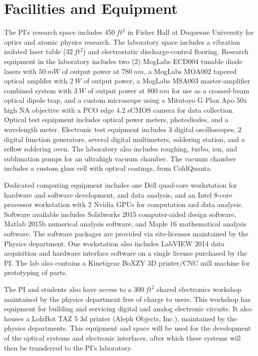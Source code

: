 \documentclass[fontsize=10pt,paper=letter,twoside=false,onecolumn]{scrartcl} %
\begin{document}
\section*{Facilities and Equipment}
The PI’s research space includes $\SI{450}{ft^2}$ in Fisher
Hall at Duquesne University for optics and atomic physics research. The laboratory space includes a
vibration isolated laser table ($\SI{32}{ft^2}$) and electrostatic discharge-control flooring. Research equipment
in the laboratory includes two (2) MogLabs ECD004 tunable diode lasers with $\SI{50}{mW}$ of output power at $\SI{780}{nm}$, a MogLabs MOA002 tapered optical amplifer with $\SI{2}{W}$ of output power, a MogLabs MSA003 master-amplifier combined system with $\SI{3}{W}$ of output power at $\SI{800}{nm}$ for use as a crossed-beam optical dipole trap, and a custom microscope using a Mitutoyo G Plan Apo 50x high NA objective with a PCO edge 4.2 sCMOS camera for data collection.
Optical test equipment includes optical power meters, photodiodes, and a wavelength meter.  Electronic test equipment includes 3 digital oscilloscopes, 2 digital function generators, several digital multimeters, soldering station, and a reflow soldering oven.
The laboratory also includes roughing, turbo, ion, and sublimation pumps for an ultrahigh vacuum chamber.  The vacuum chamber includes a custom glass cell with optical coatings, from ColdQuanta.

Dedicated computing equipment includes
one Dell quad-core workstation for hardware and software development, and data analysis, and an Intel 8-core processor workstation with 2 Nvidia GPUs for
computation and data analysis.  Software available includes
 Solidworks 2015 computer-aided design software, Matlab 2015b numerical analysis
software, and Maple 16 mathematical analysis software. The software packages are provided via
site-licenses maintained by the Physics department. One workstation also includes LabVIEW 2014
data acquisition and hardware interface software on a single license purchased by the PI.
The lab also contains a Kinetigear BoXZY 3D printer/CNC mill machine for  prototyping of parts.

The PI and students also have access to a $\SI{300}{ft^2}$ shared electronics workshop maintained by the physics
department free of charge to users. This workshop has equipment for building and servicing digital
and analog electronic circuits. It also houses a LolzBot TAZ 5 3d printer (Aleph Objects, Inc.), maintained by the
physics departments.
This equipment and space will be used for the development of the optical systems and electronic
interfaces, after which these systems will then be transferred to the PI’s laboratory.
\end{document}
